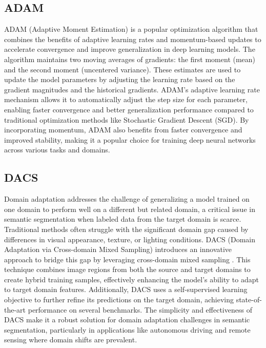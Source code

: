 \documentclass[a4paper,12pt]{article}
\begin{document}
\subsection{ADAM}

ADAM (Adaptive Moment Estimation) is a popular optimization algorithm that combines the benefits of adaptive learning rates and momentum-based updates to accelerate convergence and improve generalization in deep learning models. The algorithm maintains two moving averages of gradients: the first moment (mean) and the second moment (uncentered variance). These estimates are used to update the model parameters by adjusting the learning rate based on the gradient magnitudes and the historical gradients. ADAM's adaptive learning rate mechanism allows it to automatically adjust the step size for each parameter, enabling faster convergence and better generalization performance compared to traditional optimization methods like Stochastic Gradient Descent (SGD). By incorporating momentum, ADAM also benefits from faster convergence and improved stability, making it a popular choice for training deep neural networks across various tasks and domains.

\subsection{DACS}

Domain adaptation addresses the challenge of generalizing a model trained on one domain to perform well on a different but related domain, a critical issue in semantic segmentation when labeled data from the target domain is scarce. Traditional methods often struggle with the significant domain gap caused by differences in visual appearance, texture, or lighting conditions. DACS (Domain Adaptation via Cross-domain Mixed Sampling) introduces an innovative approach to bridge this gap by leveraging cross-domain mixed sampling \cite{tranheden2021dacs}. This technique combines image regions from both the source and target domains to create hybrid training samples, effectively enhancing the model's ability to adapt to target domain features. Additionally, DACS uses a self-supervised learning objective to further refine its predictions on the target domain, achieving state-of-the-art performance on several benchmarks. The simplicity and effectiveness of DACS make it a robust solution for domain adaptation challenges in semantic segmentation, particularly in applications like autonomous driving and remote sensing where domain shifts are prevalent.
\end{document}
